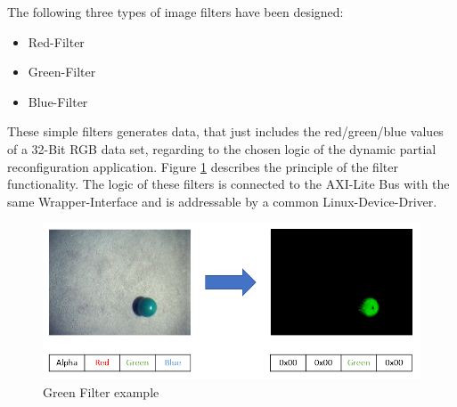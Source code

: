 The following three types of image filters have been designed:
\begin{itemize}
\item Red-Filter
\item Green-Filter
\item Blue-Filter
\end{itemize}
These simple filters generates data, that just includes the red/green/blue values of a 32-Bit RGB data set, regarding to the chosen logic of the dynamic partial reconfiguration application. Figure \ref{fig:imagefilter} describes the principle of the filter functionality. The logic of these filters is connected to the AXI-Lite Bus with the same Wrapper-Interface and is addressable by a common Linux-Device-Driver.
\begin{figure}[h]
\centering
\includegraphics[width=1\textwidth]{sections/methodology/ImageFilter.PNG}
\caption{\label{fig:imagefilter} Green Filter example}
\end{figure}